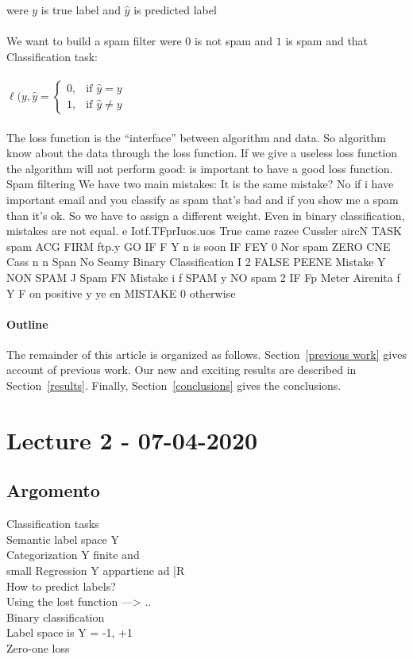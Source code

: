 \documentclass[12pt]{article}
\begin{document}
were $y $ is true label and $\hat{y}$ is predicted label
\\\\
We want to build a spam filter were $0$ is not spam and $1$ is spam and that 
Classification task: 
\\\\
$
\ell(y,\hat{y} = \begin{cases} 0, & \mbox{if } \hat{y} = y 
\\ 1, & 
\mbox{if }\hat{y} \neq y
\end{cases}
$
\\\\
The loss function is the “interface” between algorithm and data.
So algorithm know about the data through the loss function.
If we give a useless loss function the algorithm will not perform good: is
important to have a good loss function.
Spam filtering
We have two main mistakes:
It is the same mistake? No if i have important email and you classify as spam
that’s bad and if you show me a spam than it’s ok.
So we have to assign a different weight.
Even in binary classification, mistakes are not equal.
e Iotf.TFprIuos.uos
True came
razee
Cussler aircN TASK spam ACG FIRM
ftp.y GO
IF F Y n is soon
IF FEY 0 Nor spam
ZERO CNE Cass
n n
Span No Seamy Binary Classification
I 2
FALSE PEENE Mistake Y NON SPAM J Spam
FN Mistake i f SPAM y NO spam
2 IF Fp Meter Airenita
f Y F on positive
y ye en MISTAKE
0 otherwise


\paragraph{Outline}
The remainder of this article is organized as follows.
Section~\ref{previous work} gives account of previous work.
Our new and exciting results are described in Section~\ref{results}.
Finally, Section~\ref{conclusions} gives the conclusions.


\section{Lecture 2 - 07-04-2020}

\subsection{Argomento}
Classification tasks\\
Semantic label space Y\\
Categorization Y finite and\\ small
Regression Y appartiene ad |R\\
How to predict labels?\\
Using the lost function —> ..\\
Binary classification\\
Label space is Y = { -1, +1 }\\
Zero-one loss\\
\end{document}
